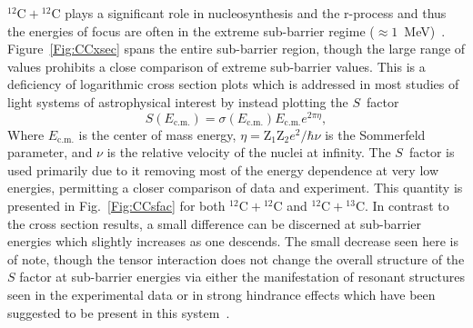 $^{12}\mathrm{C}+\mathrm{^{12}C}$ plays a significant role in nucleosynthesis and the r-process and thus the energies of focus are often in the extreme sub-barrier regime ($\approx 1$~MeV)~\citep{cumming2001,strohmayer2002,hoyle1954,godbey2019b}.
Figure~\ref{Fig:CCxsec} spans the entire sub-barrier region, though the large range of values prohibits a close comparison of extreme sub-barrier values.
This is a deficiency of logarithmic cross section plots which is addressed in most studies of light systems of astrophysical interest by instead plotting the $S$~factor
\begin{equation}
S(E_{\mathrm{c.m.}})=\sigma(E_{\mathrm{c.m.}})E_{\mathrm{c.m.}}e^{2\pi\eta},
\end{equation}
Where $E_{\mathrm{c.m.}}$ is the center of mass energy, $\eta=\mathrm{Z_1}\mathrm{Z_2}e^2/\hbar\nu$ is the Sommerfeld parameter, and $\nu$ is the relative velocity of the nuclei at infinity.
The $S$~factor is used primarily due to it removing most of the energy dependence at very low energies, permitting a closer comparison of data and experiment.
This quantity is presented in Fig.~\ref{Fig:CCsfac} for both $^{12}\mathrm{C}+\mathrm{^{12}C}$ and $^{12}\mathrm{C}+\mathrm{^{13}C}$.
In contrast to the cross section results, a small difference can be discerned at sub-barrier energies which slightly increases as one descends.
The small decrease seen here is of note, though the tensor interaction does not change the overall structure of the $S$ factor at sub-barrier energies via either the manifestation of resonant structures seen in the experimental data or in strong hindrance effects which have been suggested to be present in this system~\citep{jiang2007}.


